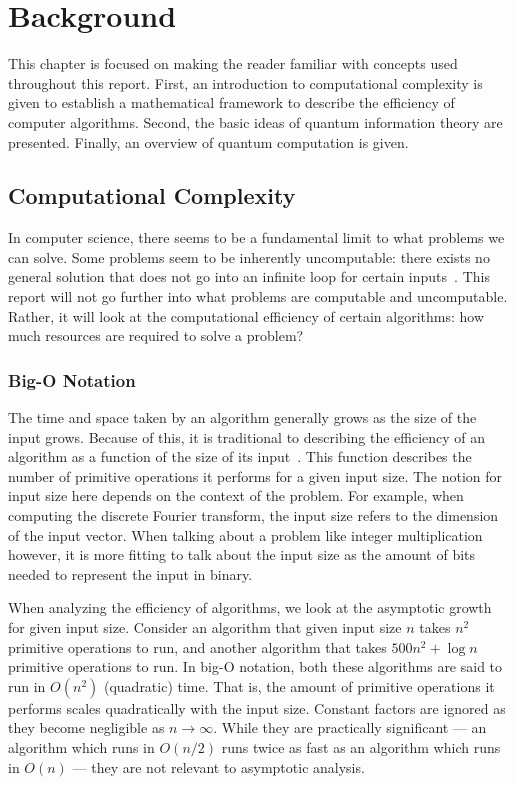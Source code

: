 \chapter{Background} \label{chap:background}
This chapter is focused on making the reader familiar with concepts used throughout this report.
First, an introduction to computational complexity is given to establish a mathematical framework to describe the efficiency of computer algorithms.
Second, the basic ideas of quantum information theory are presented.
Finally, an overview of quantum computation is given.

\section{Computational Complexity}
In computer science, there seems to be a fundamental limit to what problems we can solve.
Some problems seem to be inherently uncomputable: there exists no general solution that does not go into an infinite loop for certain inputs~\cite{church1936note, turing1937computable}.
This report will not go further into what problems are computable and uncomputable.
Rather, it will look at the computational efficiency of certain algorithms: how much resources are required to solve a problem?

\subsection{Big-O Notation}
The time and space taken by an algorithm generally grows as the size of the input grows.
Because of this, it is traditional to describing the efficiency of an algorithm as a function of the size of its input~\cite{cormen2009introduction}.
This function describes the number of primitive operations it performs for a given input size.
The notion for input size here depends on the context of the problem.
For example, when computing the discrete Fourier transform, the input size refers to the dimension of the input vector.
When talking about a problem like integer multiplication however, it is more fitting to talk about the input size as the amount of bits needed to represent the input in binary.

When analyzing the efficiency of algorithms, we look at the asymptotic growth for given input size.
Consider an algorithm that given input size $n$ takes $n^2$ primitive operations to run, and another algorithm that takes $500n^2 + \log n$ primitive operations to run.
In big-O notation, both these algorithms are said to run in $O(n^2)$ (quadratic) time.
That is, the amount of primitive operations it performs scales quadratically with the input size.
Constant factors are ignored as they become negligible as $n \to \infty$.
While they are practically significant --- an algorithm which runs in $O(n/2)$ runs twice as fast as an algorithm which runs in $O(n)$ --- they are not relevant to asymptotic analysis. 

